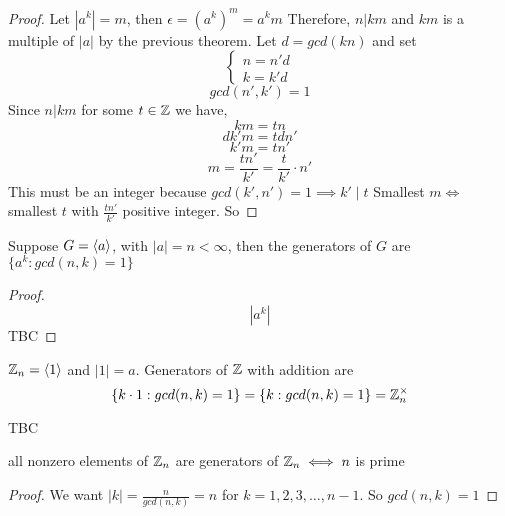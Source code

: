 \documentclass[openany]{report}
\begin{document}
\begin{proof}
    Let $|a^k| = m$, then $\epsilon = (a^k)^m = a^km$
    Therefore, $n |km$ and $km$ is a multiple of $|a|$ by the previous theorem. Let $d = gcd(kn)$ and set\\
    $$\begin{cases}
        n = n'd\\
        k = k'd
    \end{cases}$$
    $$gcd(n',k') = 1$$
    Since $n | km$ for some $t \in \mathbb{Z}$ we have,
    $$km = tn$$
    $$dk'm = tdn'$$
    $$k'm = tn'$$
    $$m = \frac{tn'}{k'} = \frac{t}{k'}\cdot n'$$
    This must be an integer because $gcd(k', n') = 1 \implies k' \mid t$
    Smallest $m \iff$ smallest $t$ with $\frac{tn'}{k'}$ positive integer. So
\end{proof}
\begin{corollary}
    Suppose $G = \langle a \rangle$, with $|a| = n < \infty$, then the generators of $G$ are $\{a^k: gcd(n,k) = 1\}$
\end{corollary}
\begin{proof}
    $$|a^k| $$ TBC 
\end{proof}
\begin{corollary}
    $\mathbb{Z}_n = \langle 1 \rangle$ and $|1| = a$. Generators of $\mathbb{Z}$ with addition are 
    $$\{k \cdot 1 : gcd(n,k) = 1\} = \{k : gcd(n,k)=1\} = \mathbb{Z}_n^\times$$
\end{corollary} TBC
\begin{corollary}
    all nonzero elements of $\mathbb{Z}_n$ are generators of $\mathbb{Z}_n \iff n$ is prime
\end{corollary}
\begin{proof}
    We want $|k| = \frac{n}{gcd(n,k)} = n$ for $k = 1,2,3,\dots, n-1$. So $gcd(n,k) = 1$
\end{proof}
\end{document}
